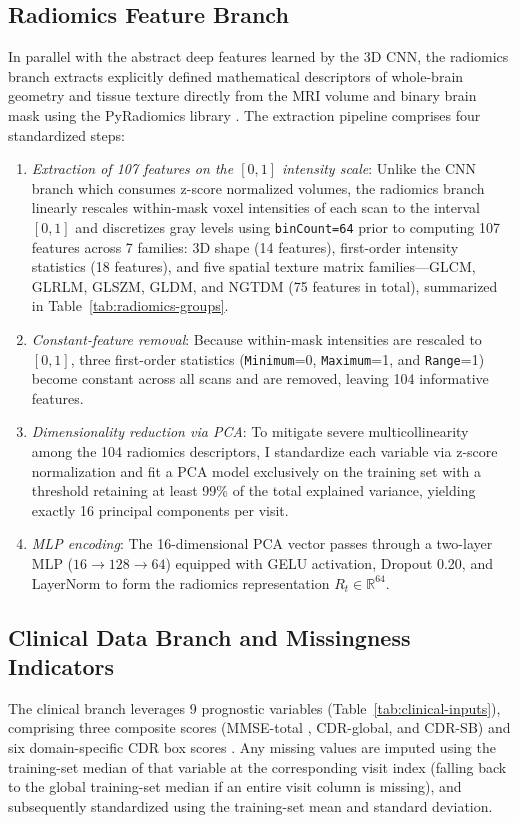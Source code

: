 \subsection{Radiomics Feature Branch}
\label{sec:radiomics-pipeline}
In parallel with the abstract deep features learned by the 3D CNN, the radiomics branch extracts explicitly defined mathematical descriptors of whole-brain geometry and tissue texture directly from the MRI volume and binary brain mask using the PyRadiomics library \cite{vangriethuysen2017computational}. The extraction pipeline comprises four standardized steps:
\begin{enumerate}
\item \emph{Extraction of 107 features on the $[0,1]$ intensity scale}: Unlike the CNN branch which consumes z-score normalized volumes, the radiomics branch linearly rescales within-mask voxel intensities of each scan to the interval $[0,1]$ and discretizes gray levels using \texttt{binCount=64} \cite{pyradiomicsbins} prior to computing 107 features across 7 families: 3D shape (14 features), first-order intensity statistics (18 features), and five spatial texture matrix families---GLCM, GLRLM, GLSZM, GLDM, and NGTDM (75 features in total), summarized in Table~\ref{tab:radiomics-groups}.
\item \emph{Constant-feature removal}: Because within-mask intensities are rescaled to $[0,1]$, three first-order statistics (\texttt{Minimum}=0, \texttt{Maximum}=1, and \texttt{Range}=1) become constant across all scans and are removed, leaving 104 informative features.
\item \emph{Dimensionality reduction via PCA}: To mitigate severe multicollinearity among the 104 radiomics descriptors, I standardize each variable via z-score normalization and fit a PCA model \cite{jolliffe2016pca} exclusively on the training set with a threshold retaining at least 99\% of the total explained variance, yielding exactly 16 principal components per visit.
\item \emph{MLP encoding}: The 16-dimensional PCA vector passes through a two-layer MLP ($16\to128\to64$) equipped with GELU activation, Dropout 0.20, and LayerNorm to form the radiomics representation $R_t\in\mathbb R^{64}$.
\end{enumerate}



\subsection{Clinical Data Branch and Missingness Indicators}
The clinical branch leverages 9 prognostic variables (Table~\ref{tab:clinical-inputs}), comprising three composite scores (MMSE-total \cite{folstein1975mmse}, CDR-global, and CDR-SB) and six domain-specific CDR box scores \cite{morris1993cdr}. Any missing values are imputed using the training-set median of that variable at the corresponding visit index (falling back to the global training-set median if an entire visit column is missing), and subsequently standardized using the training-set mean and standard deviation.

